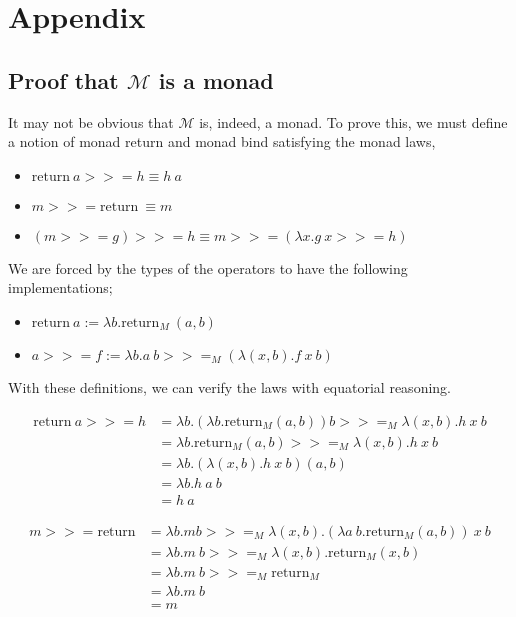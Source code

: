 \section{Appendix}\label{sec:appendix}

\subsection{Proof that $\mathcal{M}$ is a monad}\label{monadProof}

It may not be obvious that $\mathcal{M}$ is, indeed, a monad. To prove this, we must define a notion of monad return and monad bind satisfying the monad laws,

\begin{itemize}
    \item $\text{return}\ a >>= h \equiv h\ a$
    \item $m >>= \text{return}\ \equiv m$
    \item $(m >>= g) >>= h \equiv m >>= (\lambda x. g\ x >>= h)$
\end{itemize}

We are forced by the types of the operators to have the following implementations;

\begin{itemize}
    \item $\text{return}\ a := \lambda b. \text{return}_M\ (a, b)$
    \item $a >>= f := \lambda b. a\ b >>=_M (\lambda (x, b). f\ x\ b) $
\end{itemize}

With these definitions, we can verify the laws with equatorial reasoning.

\begin{equation} \label{monLaw1}
\begin{split}
\text{return}\ a >>= h
 & = \lambda b. (\lambda b. \text{return}_M (a, b)) b >>=_M \lambda (x, b). h\ x\ b\\
 & = \lambda b. \text{return}_M (a, b) >>=_M \lambda (x, b). h\ x\ b\\
 & = \lambda b. (\lambda (x, b). h\ x\ b) (a, b)\\
 & = \lambda b. h\ a\ b\\
 & = h\ a
\end{split}
\end{equation}

\begin{equation} \label{monLaw2}
\begin{split}
m >>= \text{return}
 & = \lambda b. m b >>=_M \lambda (x, b). (\lambda a\ b. \text{return}_M (a, b))\ x\ b\\
 & = \lambda b. m\ b >>=_M \lambda (x, b). \text{return}_M (x, b)\\
 & = \lambda b. m\ b >>=_M \text{return}_M\\
 & = \lambda b. m\ b\\
 & = m
\end{split}
\end{equation}

